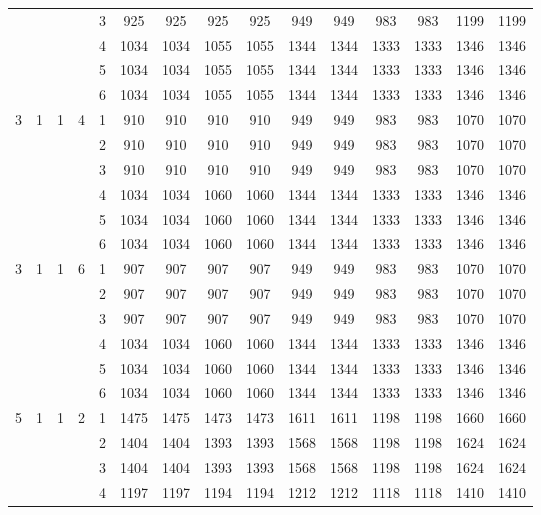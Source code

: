 \begin{longtable}{|c|c|c|c|c|c c|c c|c c|c c|c c|}
 & & & & 3 & 925 & 925 & 925 & 925 & 949 & 949 & 983 & 983 & 1199 & 1199 \\
 & & & & 4 & 1034 & 1034 & 1055 & 1055 & 1344 & 1344 & 1333 & 1333 & 1346 & 1346 \\
 & & & & 5 & 1034 & 1034 & 1055 & 1055 & 1344 & 1344 & 1333 & 1333 & 1346 & 1346 \\
 & & & & 6 & 1034 & 1034 & 1055 & 1055 & 1344 & 1344 & 1333 & 1333 & 1346 & 1346 \\
\hline
\multirow{6}{*}{3} & \multirow{6}{*}{1} & \multirow{6}{*}{1} & \multirow{6}{*}{4} & 1 & 910 & 910 & 910 & 910 & 949 & 949 & 983 & 983 & 1070 & 1070 \\
 & & & & 2 & 910 & 910 & 910 & 910 & 949 & 949 & 983 & 983 & 1070 & 1070 \\
 & & & & 3 & 910 & 910 & 910 & 910 & 949 & 949 & 983 & 983 & 1070 & 1070 \\
 & & & & 4 & 1034 & 1034 & 1060 & 1060 & 1344 & 1344 & 1333 & 1333 & 1346 & 1346 \\
 & & & & 5 & 1034 & 1034 & 1060 & 1060 & 1344 & 1344 & 1333 & 1333 & 1346 & 1346 \\
 & & & & 6 & 1034 & 1034 & 1060 & 1060 & 1344 & 1344 & 1333 & 1333 & 1346 & 1346 \\
\hline
\multirow{6}{*}{3} & \multirow{6}{*}{1} & \multirow{6}{*}{1} & \multirow{6}{*}{6} & 1 & 907 & 907 & 907 & 907 & 949 & 949 & 983 & 983 & 1070 & 1070 \\
 & & & & 2 & 907 & 907 & 907 & 907 & 949 & 949 & 983 & 983 & 1070 & 1070 \\
 & & & & 3 & 907 & 907 & 907 & 907 & 949 & 949 & 983 & 983 & 1070 & 1070 \\
 & & & & 4 & 1034 & 1034 & 1060 & 1060 & 1344 & 1344 & 1333 & 1333 & 1346 & 1346 \\
 & & & & 5 & 1034 & 1034 & 1060 & 1060 & 1344 & 1344 & 1333 & 1333 & 1346 & 1346 \\
 & & & & 6 & 1034 & 1034 & 1060 & 1060 & 1344 & 1344 & 1333 & 1333 & 1346 & 1346 \\
\hline
\multirow{6}{*}{5} & \multirow{6}{*}{1} & \multirow{6}{*}{1} & \multirow{6}{*}{2} & 1 & 1475 & 1475 & 1473 & 1473 & 1611 & 1611 & 1198 & 1198 & 1660 & 1660 \\
 & & & & 2 & 1404 & 1404 & 1393 & 1393 & 1568 & 1568 & 1198 & 1198 & 1624 & 1624 \\
 & & & & 3 & 1404 & 1404 & 1393 & 1393 & 1568 & 1568 & 1198 & 1198 & 1624 & 1624 \\
 & & & & 4 & 1197 & 1197 & 1194 & 1194 & 1212 & 1212 & 1118 & 1118 & 1410 & 1410 \\

\end{longtable}
